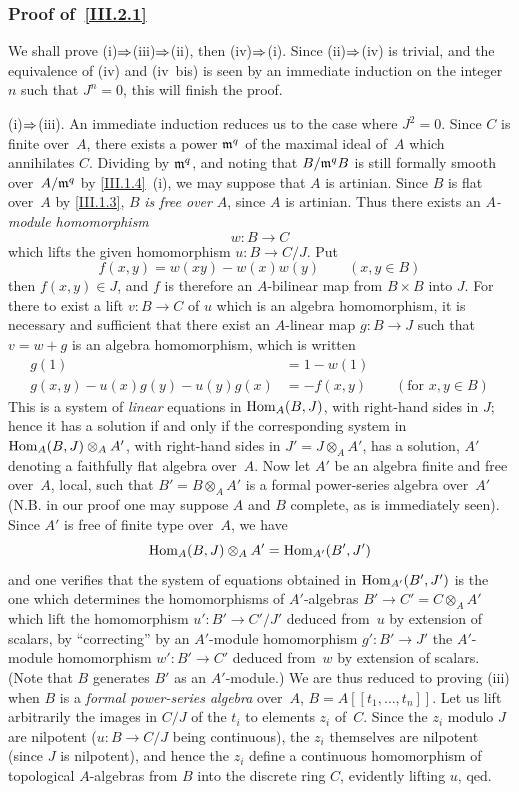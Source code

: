 \subsubsection*{Proof of~\ref{III.2.1}}
We shall prove (i)$\To$(iii)$\To$(ii), then (iv)$\To$(i). Since
(ii)$\To$(iv) is trivial, and the equivalence of (iv) and (iv~bis)
is seen by an immediate induction on the integer $n$ such that
$J^n = 0$, this will finish the proof.

(i)$\To$(iii). An immediate induction reduces us to the case where
$J^2 = 0$. Since $C$ is finite over~$A$, there exists a power
$\mathfrak{m}^q$ of the maximal ideal of~$A$ which annihilates $C$.
Dividing by $\mathfrak{m}^q$, and noting that $B/\mathfrak{m}^qB$ is still
formally smooth over~$A/\mathfrak{m}^q$ by \ref{III.1.4}~(i), we may
suppose that $A$ is artinian. Since $B$ is flat over~$A$ by
\ref{III.1.3}, $B$ \emph{is free over} $A$, since $A$ is artinian.
Thus there exists an \emph{$A$-module homomorphism}
$$
w \colon B \to C
$$
which lifts the given homomorphism $u \colon B \to C/J$. Put
$$
f(x,y) = w(xy) - w(x)w(y) \qquad (x,y \in B)
$$
then $f(x,y) \in J$, and $f$ is therefore an $A$-bilinear map from
$B \times B$ into $J$. For there to exist a lift $v \colon B \to C$
of $u$ which is an algebra homomorphism, it is necessary and
sufficient that there exist an $A$-linear map $g \colon B \to J$ such
that $v = w + g$ is an algebra homomorphism, which is written
\begin{align*}
g(1) &= 1 - w(1) \\
g(x,y) - u(x)g(y) -u(y)g(x) &= -f(x,y) \qquad (\text{for } x,y \in
B)
\end{align*}
This is a system of \emph{linear} equations in
$\operatorname{Hom}_A(B,J)$, with right-hand sides in $J$; hence it has a solution
if and only if the corresponding system in $\operatorname{Hom}_A(B,J)\otimes_A A'$, with
right-hand sides in $J' = J \otimes_A A'$, has a solution, $A'$
denoting a faithfully flat algebra over~$A$. Now let $A'$ be an
algebra finite and free over~$A$, local, such that $B' = B \otimes_A A'$ is
a formal power-series algebra over~$A'$ (N.B. in our proof one may
suppose $A$ and $B$ complete, as is immediately seen). Since $A'$ is
free of finite type over~$A$, we have
$$
\operatorname{Hom}_A(B,J) \otimes_A A' = \operatorname{Hom}_{A'}(B',J')
$$
and one verifies that the system of equations obtained in
$\operatorname{Hom}_{A'}(B',J')$ is the one which determines the homomorphisms of
$A'$-algebras $B' \to C' = C \otimes_A A'$ which lift the
homomorphism $u' \colon B' \to C'/J'$ deduced from~$u$ by extension
of scalars, by ``correcting'' by an $A'$-module homomorphism
$g' \colon B' \to J'$ the $A'$-module homomorphism $w' \colon B' \to C'$
deduced from~$w$ by extension of scalars. (Note that $B$ generates
$B'$ as an $A'$-module.) We are thus reduced to proving (iii) when
$B$ is a \emph{formal power-series algebra} over~$A$,
$B = A[[t_1,\dots,t_n]]$. Let us lift arbitrarily the images in
$C/J$ of the $t_i$ to elements $z_i$ of~$C$. Since the $z_i$ modulo
$J$ are nilpotent ($u \colon B \to C/J$ being continuous), the $z_i$
themselves are nilpotent (since $J$ is nilpotent), and hence the
$z_i$ define a continuous homomorphism of topological $A$-algebras
from $B$ into the discrete ring $C$, evidently lifting $u$, qed.

